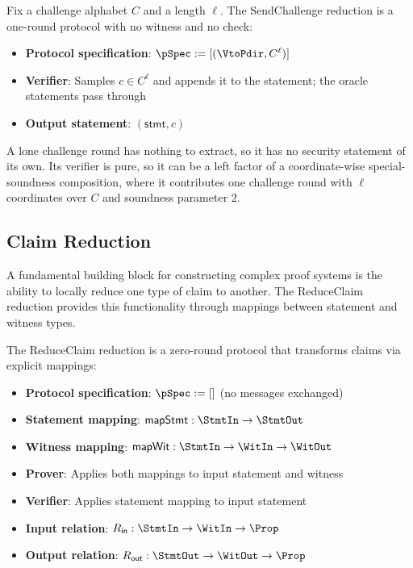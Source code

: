 \begin{definition}
    \label{def:sendchallenge_oracle_reduction}
    Fix a challenge alphabet $C$ and a length $\ell$. The SendChallenge reduction is a one-round protocol with no witness and no check:
    \begin{itemize}
        \item \textbf{Protocol specification}: $\pSpec := [(\VtoPdir, C^{\ell})]$
        \item \textbf{Verifier}: Samples $c \in C^{\ell}$ and appends it to the statement; the oracle statements pass through
        \item \textbf{Output statement}: $(\mathsf{stmt}, c)$
    \end{itemize}
    A lone challenge round has nothing to extract, so it has no security statement of its own. Its verifier is pure, so it can be a left factor of a coordinate-wise special-soundness composition, where it contributes one challenge round with $\ell$ coordinates over $C$ and soundness parameter $2$.
    \leanok
\end{definition}

\subsection{Claim Reduction}

A fundamental building block for constructing complex proof systems is the ability to locally reduce one type of claim to another. The ReduceClaim reduction provides this functionality through mappings between statement and witness types.

\begin{definition}
    \label{def:reduceclaim_reduction}
    The ReduceClaim reduction is a zero-round protocol that transforms claims via explicit mappings:
    \begin{itemize}
        \item \textbf{Protocol specification}: $\pSpec := []$ (no messages exchanged)
        \item \textbf{Statement mapping}: $\mathsf{mapStmt} : \StmtIn \to \StmtOut$
        \item \textbf{Witness mapping}: $\mathsf{mapWit} : \StmtIn \to \WitIn \to \WitOut$
        \item \textbf{Prover}: Applies both mappings to input statement and witness
        \item \textbf{Verifier}: Applies statement mapping to input statement
        \item \textbf{Input relation}: $R_{\mathsf{in}} : \StmtIn \to \WitIn \to \Prop$
        \item \textbf{Output relation}: $R_{\mathsf{out}} : \StmtOut \to \WitOut \to \Prop$
    \end{itemize}
    \leanok
\end{definition}

